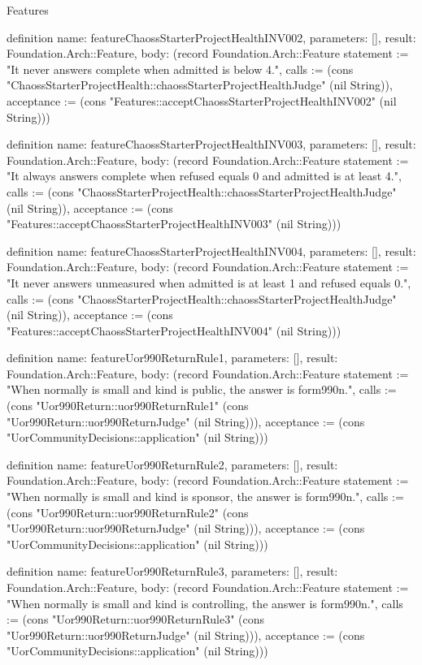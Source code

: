 \begin{lexlean}{Features}
\begin{semanticmodule}
definition{
  name: featureChaossStarterProjectHealthINV002,
  parameters: [],
  result: Foundation.Arch::Feature,
  body: (record Foundation.Arch::Feature {statement := "It never answers complete when admitted is below 4.", calls := (cons "ChaossStarterProjectHealth::chaossStarterProjectHealthJudge" (nil String)), acceptance := (cons "Features::acceptChaossStarterProjectHealthINV002" (nil String))})
}

definition{
  name: featureChaossStarterProjectHealthINV003,
  parameters: [],
  result: Foundation.Arch::Feature,
  body: (record Foundation.Arch::Feature {statement := "It always answers complete when refused equals 0 and admitted is at least 4.", calls := (cons "ChaossStarterProjectHealth::chaossStarterProjectHealthJudge" (nil String)), acceptance := (cons "Features::acceptChaossStarterProjectHealthINV003" (nil String))})
}

definition{
  name: featureChaossStarterProjectHealthINV004,
  parameters: [],
  result: Foundation.Arch::Feature,
  body: (record Foundation.Arch::Feature {statement := "It never answers unmeasured when admitted is at least 1 and refused equals 0.", calls := (cons "ChaossStarterProjectHealth::chaossStarterProjectHealthJudge" (nil String)), acceptance := (cons "Features::acceptChaossStarterProjectHealthINV004" (nil String))})
}

definition{
  name: featureUor990ReturnRule1,
  parameters: [],
  result: Foundation.Arch::Feature,
  body: (record Foundation.Arch::Feature {statement := "When normally is small and kind is public, the answer is form990n.", calls := (cons "Uor990Return::uor990ReturnRule1" (cons "Uor990Return::uor990ReturnJudge" (nil String))), acceptance := (cons "UorCommunityDecisions::application" (nil String))})
}

definition{
  name: featureUor990ReturnRule2,
  parameters: [],
  result: Foundation.Arch::Feature,
  body: (record Foundation.Arch::Feature {statement := "When normally is small and kind is sponsor, the answer is form990n.", calls := (cons "Uor990Return::uor990ReturnRule2" (cons "Uor990Return::uor990ReturnJudge" (nil String))), acceptance := (cons "UorCommunityDecisions::application" (nil String))})
}

definition{
  name: featureUor990ReturnRule3,
  parameters: [],
  result: Foundation.Arch::Feature,
  body: (record Foundation.Arch::Feature {statement := "When normally is small and kind is controlling, the answer is form990n.", calls := (cons "Uor990Return::uor990ReturnRule3" (cons "Uor990Return::uor990ReturnJudge" (nil String))), acceptance := (cons "UorCommunityDecisions::application" (nil String))})
}


\end{semanticmodule}
\end{lexlean}
